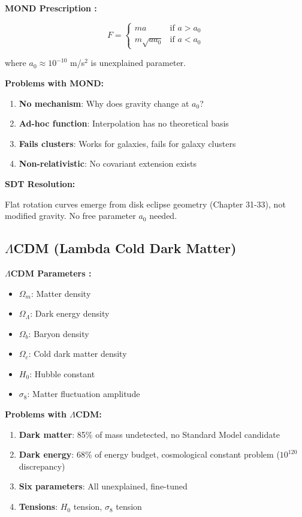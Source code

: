 \textbf{MOND Prescription \cite{milgrom1983modification}:}

\begin{equation}
F = \begin{cases}
ma & \text{if } a > a_0 \\
m\sqrt{a a_0} & \text{if } a < a_0
\end{cases}
\end{equation}

where $a_0 \approx 10^{-10}$ m/s$^2$ is unexplained parameter.

\textbf{Problems with MOND:}

\begin{enumerate}
\item \textbf{No mechanism}: Why does gravity change at $a_0$?
\item \textbf{Ad-hoc function}: Interpolation has no theoretical basis
\item \textbf{Fails clusters}: Works for galaxies, fails for galaxy clusters \cite{sanders2002modified}
\item \textbf{Non-relativistic}: No covariant extension exists
\end{enumerate}

\textbf{SDT Resolution:}

Flat rotation curves emerge from disk eclipse geometry (Chapter 31-33), not modified gravity. No free parameter $a_0$ needed.

\subsection{$\Lambda$CDM (Lambda Cold Dark Matter)}

\textbf{$\Lambda$CDM Parameters \cite{planck2018cosmological}:}

\begin{itemize}
\item $\Omega_m$: Matter density
\item $\Omega_\Lambda$: Dark energy density
\item $\Omega_b$: Baryon density
\item $\Omega_c$: Cold dark matter density
\item $H_0$: Hubble constant
\item $\sigma_8$: Matter fluctuation amplitude
\end{itemize}

\textbf{Problems with $\Lambda$CDM:}

\begin{enumerate}
\item \textbf{Dark matter}: 85\% of mass undetected, no Standard Model candidate \cite{bertone2005particle}
\item \textbf{Dark energy}: 68\% of energy budget, cosmological constant problem ($10^{120}$ discrepancy) \cite{weinberg1989cosmological}
\item \textbf{Six parameters}: All unexplained, fine-tuned
\item \textbf{Tensions}: $H_0$ tension, $\sigma_8$ tension \cite{verde2019tensions}
\end{enumerate}

